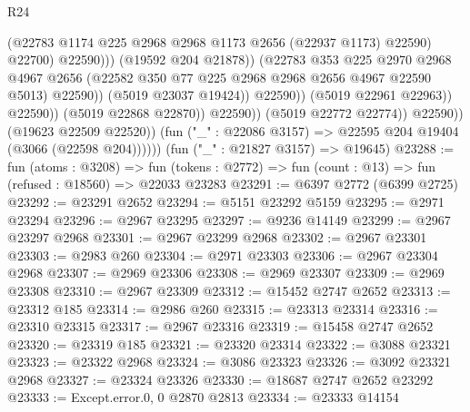 \begin{lexlean}{R24}
\begin{coremodule}
                                                (@22783
                                                  @1174
                                                  @225
                                                  @2968
                                                  @2968
                                                  @1173
                                                  @2656
                                                  (@22937 @1173)
                                                  @22590)
                                                @22700)
                                              @22590)))
                                        (@19592 @204 @21878))
                                      (@22783
                                        @353
                                        @225
                                        @2970
                                        @2968
                                        @4967
                                        @2656
                                        (@22582 @350 @77 @225 @2968 @2968 @2656 @4967 @22590 @5013)
                                        @22590))
                                    (@5019 @23037 @19424))
                                  @22590))
                              (@5019 @22961 @22963))
                            @22590))
                        (@5019 @22868 @22870))
                      @22590))
                  (@5019 @22772 @22774))
                @22590))
            (@19623 @22509 @22520))
          (fun ("_" : @22086 @3157) => @22595 @204 @19404 (@3066 (@22598 @204))))))
    (fun ("_" : @21827 @3157) => @19645)
@23288 := fun (atoms : @3208) =>
  fun (tokens : @2772) => fun (count : @13) => fun (refused : @18560) => @22033 @23283
@23291 := @6397 @2772 (@6399 @2725)
@23292 := @23291 @2652
@23294 := @5151 @23292 @5159
@23295 := @2971 @23294
@23296 := @2967 @23295
@23297 := @9236 @14149
@23299 := @2967 @23297 @2968
@23301 := @2967 @23299 @2968
@23302 := @2967 @23301
@23303 := @2983 @260
@23304 := @2971 @23303
@23306 := @2967 @23304 @2968
@23307 := @2969 @23306
@23308 := @2969 @23307
@23309 := @2969 @23308
@23310 := @2967 @23309
@23312 := @15452 @2747 @2652
@23313 := @23312 @185
@23314 := @2986 @260
@23315 := @23313 @23314
@23316 := @23310 @23315
@23317 := @2967 @23316
@23319 := @15458 @2747 @2652
@23320 := @23319 @185
@23321 := @23320 @23314
@23322 := @3088 @23321
@23323 := @23322 @2968
@23324 := @3086 @23323
@23326 := @3092 @23321 @2968
@23327 := @23324 @23326
@23330 := @18687 @2747 @2652 @23292
@23333 := Except.error.{0, 0} @2870 @2813
@23334 := @23333 @14154

\end{coremodule}
\end{lexlean}
